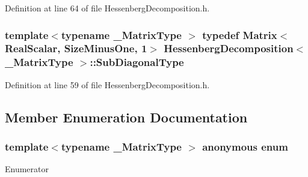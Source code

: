Definition at line 64 of file Hessenberg\-Decomposition.\-h.

\hypertarget{class_hessenberg_decomposition_a9f0a958d44cd3eab363e733c98790ae9}{
\subsubsection[{Sub\-Diagonal\-Type}]{\setlength{\rightskip}{0pt plus 5cm}template$<$typename \-\_\-\-Matrix\-Type $>$ typedef {\bf Matrix}$<${\bf Real\-Scalar}, {\bf Size\-Minus\-One}, 1$>$ {\bf Hessenberg\-Decomposition}$<$ \-\_\-\-Matrix\-Type $>$\-::{\bf Sub\-Diagonal\-Type}}}\label{class_hessenberg_decomposition_a9f0a958d44cd3eab363e733c98790ae9}


Definition at line 59 of file Hessenberg\-Decomposition.\-h.



\subsection{Member Enumeration Documentation}
\hypertarget{class_hessenberg_decomposition_a66c0a2c644571e4a7b784c7738a81f9d}{\subsubsection[{anonymous enum}]{\setlength{\rightskip}{0pt plus 5cm}template$<$typename \-\_\-\-Matrix\-Type $>$ anonymous enum}}\label{class_hessenberg_decomposition_a66c0a2c644571e4a7b784c7738a81f9d}
\begin{Desc}
\item[Enumerator]\par
\begin{description}
\item[{\em 
\hypertarget{class_hessenberg_decomposition_a66c0a2c644571e4a7b784c7738a81f9dade9123ba4fb314e91b3cde74953dcf95}{Size}\label{class_hessenberg_decomposition_a66c0a2c644571e4a7b784c7738a81f9dade9123ba4fb314e91b3cde74953dcf95}
}]\item[{\em 
\hypertarget{class_hessenberg_decomposition_a66c0a2c644571e4a7b784c7738a81f9dae787f92f691d17275bfc8b3c49d4f1ea}{Size\-Minus\-One}\label{class_hessenberg_decomposition_a66c0a2c644571e4a7b784c7738a81f9dae787f92f691d17275bfc8b3c49d4f1ea}
}]\end{description}
\end{Desc}


